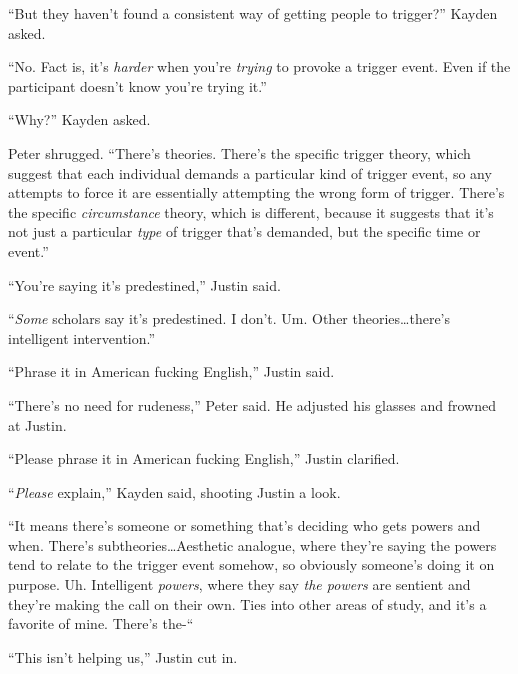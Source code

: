 ``But they haven't found a consistent way of getting people to trigger?'' Kayden asked.



``No.  Fact is, it's \emph{harder} when you're \emph{trying }to provoke a trigger event.  Even if the participant doesn't know you're trying it.''



``Why?''  Kayden asked.



Peter shrugged.  ``There's theories.  There's the specific trigger theory, which suggest that each individual demands a particular kind of trigger event, so any attempts to force it are essentially attempting the wrong form of trigger.  There's the specific \emph{circumstance} theory, which is different, because it suggests that it's not just a particular \emph{type }of trigger that's demanded, but the specific time or event.''



``You're saying it's predestined,'' Justin said.



``\emph{Some} scholars say it's predestined.  I don't.  Um.  Other theories\ldots there's intelligent intervention.''



``Phrase it in American fucking English,'' Justin said.



``There's no need for rudeness,'' Peter said.  He adjusted his glasses and frowned at Justin.



``Please phrase it in American fucking English,'' Justin clarified.



``\emph{Please} explain,'' Kayden said, shooting Justin a look.



``It means there's someone or something that's deciding who gets powers and when.  There's subtheories\ldots Aesthetic analogue, where they're saying the powers tend to relate to the trigger event somehow, so obviously someone's doing it on purpose.  Uh.  Intelligent \emph{powers}, where they say \emph{the powers }are sentient and they're making the call on their own.  Ties into other areas of study, and it's a favorite of mine.  There's the-``



``This isn't helping us,'' Justin cut in.



